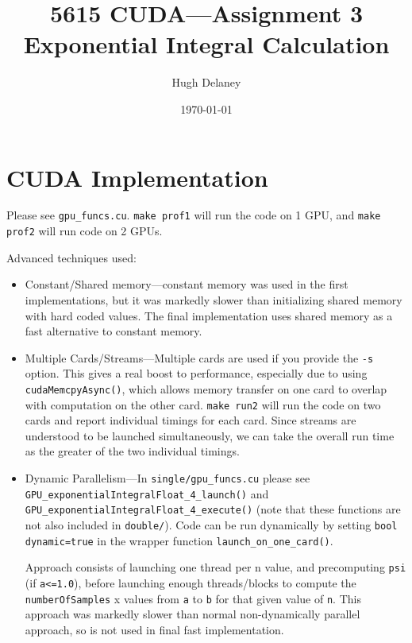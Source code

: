 \documentclass[a4paper, fleqn]{article}
\date{\today}
\author{Hugh Delaney}
\title{5615 CUDA---Assignment 3 \\ Exponential Integral Calculation}
\begin{document}
\maketitle
        \section{CUDA Implementation}%
        \label{sec:cuda_implementation}
        
        Please see \texttt{gpu\_funcs.cu}. \texttt{make prof1} will run the code on 1 GPU, and \texttt{make prof2} will run code on 2 GPUs. 

        Advanced techniques used:
        \begin{itemize}
                \item Constant/Shared memory---constant memory was used in the first implementations, but it was markedly slower than initializing shared memory with hard coded values. The final implementation uses shared memory as a fast alternative to constant memory.
                \item Multiple Cards/Streams---Multiple cards are used if you provide the \texttt{-s} option. This gives a real boost to performance, especially due to using \texttt{cudaMemcpyAsync()}, which allows memory transfer on one card to overlap with computation on the other card. \texttt{make run2} will run the code on two cards and report individual timings for each card. Since streams are understood to be launched simultaneously, we can take the overall run time as the greater of the two individual timings. 
                \item Dynamic Parallelism---In \texttt{single/gpu\_funcs.cu} please see \texttt{GPU\_exponentialIntegralFloat\_4\_launch()} and 
                        \texttt{GPU\_exponentialIntegralFloat\_4\_execute()}  (note that these functions are not also included in \texttt{double/}). Code can be run dynamically by setting \texttt{bool dynamic=true} in the wrapper function \texttt{launch\_on\_one\_card()}. 

                        Approach consists of launching one thread per n value, and precomputing \texttt{psi} (if \texttt{a<=1.0}), before launching enough threads/blocks to compute the \texttt{numberOfSamples} x values from \texttt{a} to \texttt{b} for that given value of \texttt{n}. This approach was markedly slower than normal non-dynamically parallel approach, so is not used in final fast implementation.
        \end{itemize}
\end{document}

